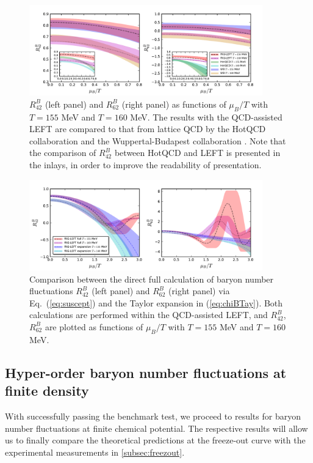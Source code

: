 \documentclass[%
reprint,
superscriptaddress,
showpacs,preprintnumbers,
amsmath,amssymb,
aps,
prd,
]{revtex4-1}
\def\Eq#1{Eq.~(\ref{#1})}
\def\eq#1{(\ref{#1})}
\begin{document}
%
\begin{figure}[t]
\includegraphics[width=0.9\textwidth]{R42R62-muBoT}
\caption{$R^{B}_{42}$ (left panel) and $R^{B}_{62}$ (right panel) as functions of $\mu_B/T$ with $T=155$ MeV and $T=160$ MeV. The results with the QCD-assisted LEFT are  compared to that from lattice QCD by the HotQCD collaboration \cite{Bazavov:2020bjn} and the Wuppertal-Budapest collaboration \cite{Borsanyi:2018grb}. Note that the comparison of $R^{B}_{42}$ between HotQCD and LEFT is presented in the inlays, in order to improve the readability of presentation.}\label{fig:R42R62-muBoT}
\end{figure}
%



	
%
\begin{figure}[t]
\includegraphics[width=0.9\textwidth]{R42R62expansion-muBoT}
\caption{Comparison between the direct full calculation of baryon number fluctuations $R^{B}_{42}$ (left panel) and $R^{B}_{62}$ (right panel) via \Eq{eq:suscept} and the Taylor expansion in \eq{eq:chiBTay}. Both calculations are performed within the QCD-assisted LEFT, and $R^{B}_{42}$, $R^{B}_{62}$ are plotted as functions of $\mu_B/T$ with $T=155$ MeV and $T=160$ MeV.}\label{fig:R42R62expansion-muBoT}
\end{figure}
%

\subsection{Hyper-order baryon number fluctuations at finite  density}
\label{subsec:hyper-ordermuB}
With successfully passing the benchmark test, we proceed to results for baryon number fluctuations at finite chemical potential. The respective results will allow us to finally compare the theoretical predictions at the freeze-out curve with the experimental measurements in \autoref{subsec:freezout}. 
\end{document}
